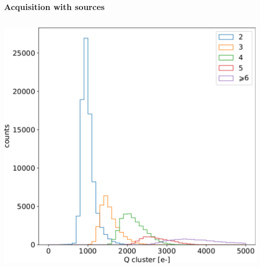     \begin{frame}
        \frametitle{Acquisition with sources}
        \begin{columns}
                \includegraphics[width=.99\linewidth]{figures/charaterization/Sr90_spectrum_cluster.pdf}
        \end{columns}
        
    \end{frame}    


